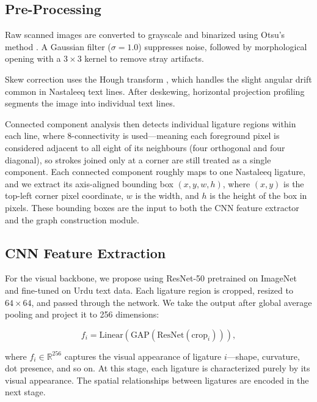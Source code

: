 \documentclass[11pt]{article}
\begin{document}
\subsection{Pre-Processing}

Raw scanned images are converted to grayscale and binarized using Otsu's method \citep{Otsu1979}.
A Gaussian filter ($\sigma = 1.0$) suppresses noise, followed by morphological opening
with a $3 \times 3$ kernel to remove stray artifacts.

Skew correction uses the Hough transform \citep{Duda1972}, which handles the slight angular drift common
in Nastaleeq text lines.
After deskewing, horizontal projection profiling segments the image into individual
text lines.

Connected component analysis then detects individual ligature regions within each line,
where 8-connectivity is used---meaning each foreground pixel is considered adjacent to
all eight of its neighbours (four orthogonal and four diagonal), so strokes joined only
at a corner are still treated as a single component.
Each connected component roughly maps to one Nastaleeq ligature, and we extract its
axis-aligned bounding box $(x, y, w, h)$, where $(x, y)$ is the top-left corner pixel
coordinate, $w$ is the width, and $h$ is the height of the box in pixels.
These bounding boxes are the input to both the CNN feature extractor and the graph
construction module.

\subsection{CNN Feature Extraction}

For the visual backbone, we propose using ResNet-50 \citep{he2016resnet} pretrained on
ImageNet and fine-tuned on Urdu text data.
Each ligature region is cropped, resized to $64 \times 64$, and passed through the
network.
We take the output after global average pooling and project it to 256 dimensions:

\begin{equation}
  f_i = \text{Linear}\!\left(\text{GAP}\!\left(\text{ResNet}(\text{crop}_i)\right)\right),
  \label{eq:cnn}
\end{equation}

where $f_i \in \mathbb{R}^{256}$ captures the visual appearance of ligature $i$---shape,
curvature, dot presence, and so on.
At this stage, each ligature is characterized purely by its visual appearance.
The spatial relationships between ligatures are encoded in the next stage.
\end{document}
